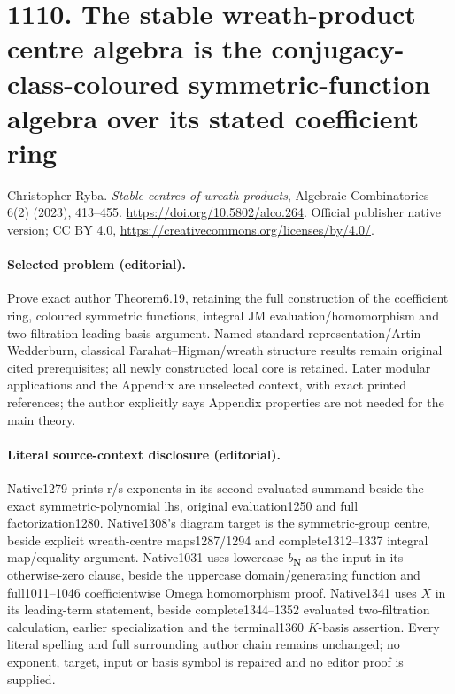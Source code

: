 \documentclass[10pt]{article}
\theoremstyle{definition}
\begin{document}
\section*{1110. The stable wreath-product centre algebra is the conjugacy-class-coloured symmetric-function algebra over its stated coefficient ring}
Christopher Ryba. \emph{Stable centres of wreath products}, Algebraic Combinatorics 6(2) (2023), 413--455. \url{https://doi.org/10.5802/alco.264}. Official publisher native version; CC BY 4.0, \url{https://creativecommons.org/licenses/by/4.0/}.\par
\paragraph{Selected problem (editorial).} Prove exact author Theorem6.19, retaining the full construction of the coefficient ring, coloured symmetric functions, integral JM evaluation/homomorphism and two-filtration leading basis argument. Named standard representation/Artin--Wedderburn, classical Farahat--Higman/wreath structure results remain original cited prerequisites; all newly constructed local core is retained. Later modular applications and the Appendix are unselected context, with exact printed references; the author explicitly says Appendix properties are not needed for the main theory.
\paragraph{Literal source-context disclosure (editorial).} Native1279 prints r/s exponents in its second evaluated summand beside the exact symmetric-polynomial lhs, original evaluation1250 and full factorization1280. Native1308's diagram target is the symmetric-group centre, beside explicit wreath-centre maps1287/1294 and complete1312--1337 integral map/equality argument. Native1031 uses lowercase \(b_{\mathbf N}\) as the input in its otherwise-zero clause, beside the uppercase domain/generating function and full1011--1046 coefficientwise Omega homomorphism proof. Native1341 uses \(X\) in its leading-term statement, beside complete1344--1352 evaluated two-filtration calculation, earlier specialization and the terminal1360 \(K\)-basis assertion. Every literal spelling and full surrounding author chain remains unchanged; no exponent, target, input or basis symbol is repaired and no editor proof is supplied.
\end{document}
